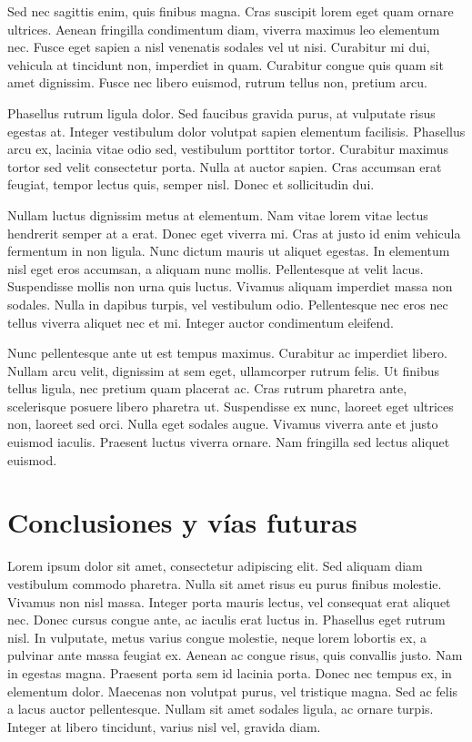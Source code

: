 Sed nec sagittis enim, quis finibus magna. Cras suscipit lorem eget quam ornare ultrices. Aenean fringilla condimentum diam, viverra maximus leo elementum nec. Fusce eget sapien a nisl venenatis sodales vel ut nisi. Curabitur mi dui, vehicula at tincidunt non, imperdiet in quam. Curabitur congue quis quam sit amet dignissim. Fusce nec libero euismod, rutrum tellus non, pretium arcu.

Phasellus rutrum ligula dolor. Sed faucibus gravida purus, at vulputate risus egestas at. Integer vestibulum dolor volutpat sapien elementum facilisis. Phasellus arcu ex, lacinia vitae odio sed, vestibulum porttitor tortor. Curabitur maximus tortor sed velit consectetur porta. Nulla at auctor sapien. Cras accumsan erat feugiat, tempor lectus quis, semper nisl. Donec et sollicitudin dui.

Nullam luctus dignissim metus at elementum. Nam vitae lorem vitae lectus hendrerit semper at a erat. Donec eget viverra mi. Cras at justo id enim vehicula fermentum in non ligula. Nunc dictum mauris ut aliquet egestas. In elementum nisl eget eros accumsan, a aliquam nunc mollis. Pellentesque at velit lacus. Suspendisse mollis non urna quis luctus. Vivamus aliquam imperdiet massa non sodales. Nulla in dapibus turpis, vel vestibulum odio. Pellentesque nec eros nec tellus viverra aliquet nec et mi. Integer auctor condimentum eleifend.

Nunc pellentesque ante ut est tempus maximus. Curabitur ac imperdiet libero. Nullam arcu velit, dignissim at sem eget, ullamcorper rutrum felis. Ut finibus tellus ligula, nec pretium quam placerat ac. Cras rutrum pharetra ante, scelerisque posuere libero pharetra ut. Suspendisse ex nunc, laoreet eget ultrices non, laoreet sed orci. Nulla eget sodales augue. Vivamus viverra ante et justo euismod iaculis. Praesent luctus viverra ornare. Nam fringilla sed lectus aliquet euismod.




\chapter{Conclusiones y vías futuras}

Lorem ipsum dolor sit amet, consectetur adipiscing elit. Sed aliquam diam vestibulum commodo pharetra. Nulla sit amet risus eu purus finibus molestie. Vivamus non nisl massa. Integer porta mauris lectus, vel consequat erat aliquet nec. Donec cursus congue ante, ac iaculis erat luctus in. Phasellus eget rutrum nisl. In vulputate, metus varius congue molestie, neque lorem lobortis ex, a pulvinar ante massa feugiat ex. Aenean ac congue risus, quis convallis justo. Nam in egestas magna. Praesent porta sem id lacinia porta. Donec nec tempus ex, in elementum dolor. Maecenas non volutpat purus, vel tristique magna. Sed ac felis a lacus auctor pellentesque. Nullam sit amet sodales ligula, ac ornare turpis. Integer at libero tincidunt, varius nisl vel, gravida diam.

